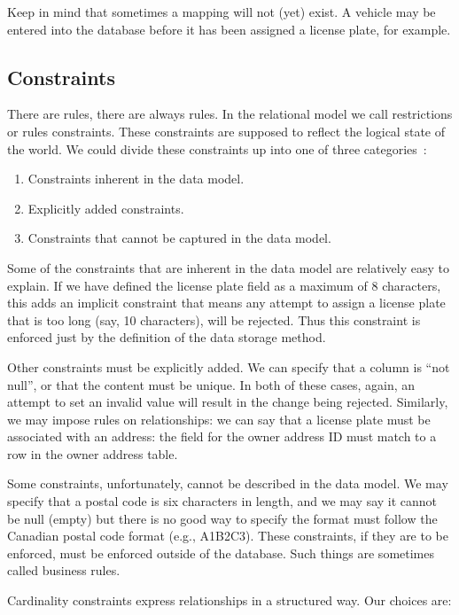 \documentclass[a4paper]{report}
\begin{document}
Keep in mind that sometimes a mapping will not (yet) exist. A vehicle may be entered into the database before it has been assigned a license plate, for example. 

\subsection*{Constraints}

There are rules, there are always rules. In the relational model we call restrictions or rules constraints. These constraints are supposed to reflect the logical state of the world. We could divide these constraints up into one of three categories~\cite{fds}:

\begin{enumerate}
\item Constraints inherent in the data model.
\item Explicitly added constraints.
\item Constraints that cannot be captured in the data model. 
\end{enumerate}

Some of the constraints that are inherent in the data model are relatively easy to explain. If we have defined the license plate field as a maximum of 8 characters, this adds an implicit constraint that means any attempt to assign a license plate that is too long (say, 10 characters), will be rejected. Thus this constraint is enforced just by the definition of the data storage method.

Other constraints must be explicitly added. We can specify that a column is ``not null'', or that the content must be unique. In both of these cases, again, an attempt to set an invalid value will result in the change being rejected. Similarly, we may impose rules on relationships: we can say that a license plate must be associated with an address: the field for the owner address ID must match to a row in the owner address table.

Some constraints, unfortunately, cannot be described in the data model. We may specify that a postal code is six characters in length, and we may say it cannot be null (empty) but there is no good way to specify the format must follow the Canadian postal code format (e.g., A1B2C3). These constraints, if they are to be enforced, must be enforced outside of the database. Such things are sometimes called business rules.

Cardinality constraints express relationships in a structured way. Our choices are:
\end{document}
